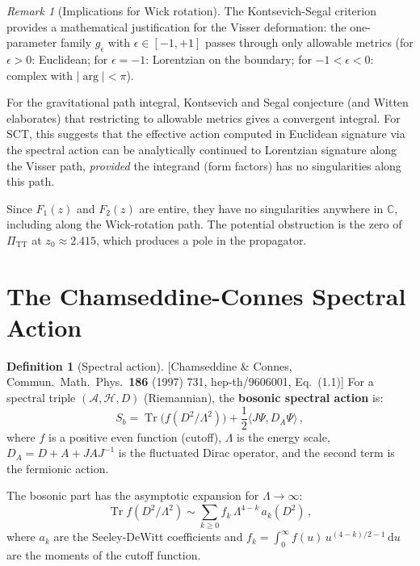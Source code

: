 \documentclass[12pt,a4paper]{article}
\theoremstyle{definition}
\newtheorem{definition}[proposition]{Definition}
\theoremstyle{remark}
\newtheorem{remark}[proposition]{Remark}
\newcommand{\Tr}{\operatorname{Tr}}
\newcommand{\dd}{\mathrm{d}}
\newcommand{\fromlit}[1]{\textcolor{blue!70!black}{\textsf{[#1]}}}
\begin{document}
\begin{remark}[Implications for Wick rotation]
\label{rem:ks-wick}
The Kontsevich-Segal criterion provides a mathematical justification
for the Visser deformation: the one-parameter family $g_\epsilon$
with $\epsilon \in [-1, +1]$ passes through only allowable metrics
(for $\epsilon > 0$: Euclidean; for $\epsilon = -1$: Lorentzian on
the boundary; for $-1 < \epsilon < 0$: complex with
$|\arg| < \pi$).

For the gravitational path integral, Kontsevich and Segal conjecture
(and Witten elaborates) that restricting to allowable metrics gives a
convergent integral.  For SCT, this suggests that the effective action
computed in Euclidean signature via the spectral action can be
analytically continued to Lorentzian signature along the Visser path,
\emph{provided} the integrand (form factors) has no singularities along
this path.

Since $F_1(z)$ and $F_2(z)$ are entire, they have no singularities
anywhere in $\mathbb{C}$, including along the Wick-rotation path.
The potential obstruction is the zero of $\Pi_{\mathrm{TT}}$ at
$z_0 \approx 2.415$, which produces a pole in the propagator.
\end{remark}


\section{The Chamseddine-Connes Spectral Action}
\label{sec:spectral-action}

\begin{definition}[Spectral action]
\label{def:spectral-action}
\fromlit{Chamseddine \& Connes, Commun.\ Math.\ Phys.\ \textbf{186}
(1997) 731, hep-th/9606001, Eq.~(1.1)}
For a spectral triple $(\mathcal{A}, \mathcal{H}, D)$ (Riemannian),
the \textbf{bosonic spectral action} is:
\begin{equation}\label{eq:cc-spectral-action}
  S_b = \Tr\bigl(f(D^2/\Lambda^2)\bigr)
  + \frac{1}{2}\langle J\Psi, D_A\Psi\rangle\,,
\end{equation}
where $f$ is a positive even function (cutoff), $\Lambda$ is the
energy scale, $D_A = D + A + JAJ^{-1}$ is the fluctuated Dirac
operator, and the second term is the fermionic action.

The bosonic part has the asymptotic expansion for
$\Lambda \to \infty$:
\begin{equation}\label{eq:cc-expansion}
  \Tr f(D^2/\Lambda^2) \sim \sum_{k \geq 0}
  f_k\,\Lambda^{4-k}\,a_k(D^2)\,,
\end{equation}
where $a_k$ are the Seeley-DeWitt coefficients and
$f_k = \int_0^\infty f(u)\,u^{(4-k)/2-1}\,\dd u$ are the moments of
the cutoff function.
\end{definition}
\end{document}
